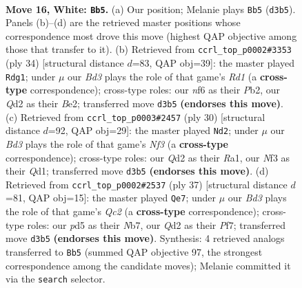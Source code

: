 \documentclass[11pt]{article}
\begin{document}
\clearpage

\begin{figure}[p]\centering
\begin{subfigure}{0.46\textwidth}\centering
\resizebox{\linewidth}{!}{%
\newchessgame
\chessboard[
  setfen={1nbq1rk1/5p2/1p2pnp1/3p3p/3P4/r1NB1NP1/P1PQ1PP1/2R1RK2 w - - 0 16},
  showmover=false,
  pgfstyle=straightmove, color=movearrow, markmove={d3-b5}
]}
\caption{}
\end{subfigure}\hfill
\begin{subfigure}{0.46\textwidth}\centering
\resizebox{\linewidth}{!}{%
\newchessgame
\chessboard[
  setfen={r5k1/pb1nq1np/1ppp2p1/3Ppr2/2P4P/P1N1PN2/1PQ1BP2/2KR3R w - - 0 18},
  showmover=false,
  pgfstyle=straightmove, color=movearrow, markmove={d1-g1}
]}
\caption{}
\end{subfigure}
\\[4pt]
\begin{subfigure}{0.46\textwidth}\centering
\resizebox{\linewidth}{!}{%
\newchessgame
\chessboard[
  setfen={r2q2k1/pp3pbp/n2p1np1/2pP4/P3rB1P/5NP1/1P2PPB1/R2Q1RK1 w - - 0 16},
  showmover=false,
  pgfstyle=straightmove, color=movearrow, markmove={f3-d2}
]}
\caption{}
\end{subfigure}\hfill
\begin{subfigure}{0.46\textwidth}\centering
\resizebox{\linewidth}{!}{%
\newchessgame
\chessboard[
  setfen={3r1rk1/1nq2pp1/2p2np1/p3p3/PbB1P3/2N1BP2/1P3QPP/R2R2K1 b - - 4 19},
  showmover=false,
  pgfstyle=straightmove, color=movearrow, markmove={c7-e7}
]}
\caption{}
\end{subfigure}
\caption{\textbf{Move 16, White: \texttt{Bb5}.} (a) Our position; Melanie plays \texttt{Bb5} (\texttt{d3b5}). Panels (b)--(d) are the retrieved master positions whose correspondence most drove this move (highest QAP objective among those that transfer to it). (b) Retrieved from \texttt{ccrl\_top\_p0002\#3353} (ply 34) [structural distance $d$=83, QAP obj=39]: the master played \texttt{Rdg1}; under $\mu$ our \emph{Bd3} plays the role of that game's \emph{Rd1} (a \textbf{cross-type} correspondence); cross-type roles: our \emph{n}f6 as their \emph{P}b2, our \emph{Q}d2 as their \emph{B}e2; transferred move \texttt{d3b5} \textbf{(endorses this move)}. (c) Retrieved from \texttt{ccrl\_top\_p0003\#2457} (ply 30) [structural distance $d$=92, QAP obj=29]: the master played \texttt{Nd2}; under $\mu$ our \emph{Bd3} plays the role of that game's \emph{Nf3} (a \textbf{cross-type} correspondence); cross-type roles: our \emph{Q}d2 as their \emph{R}a1, our \emph{N}f3 as their \emph{Q}d1; transferred move \texttt{d3b5} \textbf{(endorses this move)}. (d) Retrieved from \texttt{ccrl\_top\_p0002\#2537} (ply 37) [structural distance $d$=81, QAP obj=15]: the master played \texttt{Qe7}; under $\mu$ our \emph{Bd3} plays the role of that game's \emph{Qc2} (a \textbf{cross-type} correspondence); cross-type roles: our \emph{p}d5 as their \emph{N}b7, our \emph{Q}d2 as their \emph{P}f7; transferred move \texttt{d3b5} \textbf{(endorses this move)}. Synthesis: 4 retrieved analogs transferred to \texttt{Bb5} (summed QAP objective 97, the strongest correspondence among the candidate moves); Melanie committed it via the \texttt{search} selector.}
\label{fig:thought-m30}
\end{figure}
\end{document}
